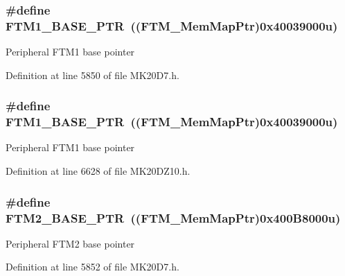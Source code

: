 \subsubsection[{\texorpdfstring{F\+T\+M1\+\_\+\+B\+A\+S\+E\+\_\+\+P\+TR}{FTM1_BASE_PTR}}]{\setlength{\rightskip}{0pt plus 5cm}\#define F\+T\+M1\+\_\+\+B\+A\+S\+E\+\_\+\+P\+TR~(({\bf F\+T\+M\+\_\+\+Mem\+Map\+Ptr})0x40039000u)}\hypertarget{group___f_t_m___peripheral_ga38115fba8eadfc94b2fc411f45906002}{}\label{group___f_t_m___peripheral_ga38115fba8eadfc94b2fc411f45906002}
Peripheral F\+T\+M1 base pointer 

Definition at line 5850 of file M\+K20\+D7.\+h.

\subsubsection[{\texorpdfstring{F\+T\+M1\+\_\+\+B\+A\+S\+E\+\_\+\+P\+TR}{FTM1_BASE_PTR}}]{\setlength{\rightskip}{0pt plus 5cm}\#define F\+T\+M1\+\_\+\+B\+A\+S\+E\+\_\+\+P\+TR~(({\bf F\+T\+M\+\_\+\+Mem\+Map\+Ptr})0x40039000u)}\hypertarget{group___f_t_m___peripheral_ga38115fba8eadfc94b2fc411f45906002}{}\label{group___f_t_m___peripheral_ga38115fba8eadfc94b2fc411f45906002}
Peripheral F\+T\+M1 base pointer 

Definition at line 6628 of file M\+K20\+D\+Z10.\+h.

\subsubsection[{\texorpdfstring{F\+T\+M2\+\_\+\+B\+A\+S\+E\+\_\+\+P\+TR}{FTM2_BASE_PTR}}]{\setlength{\rightskip}{0pt plus 5cm}\#define F\+T\+M2\+\_\+\+B\+A\+S\+E\+\_\+\+P\+TR~(({\bf F\+T\+M\+\_\+\+Mem\+Map\+Ptr})0x400\+B8000u)}\hypertarget{group___f_t_m___peripheral_ga897564efeaf1be1f991305d294eda3d6}{}\label{group___f_t_m___peripheral_ga897564efeaf1be1f991305d294eda3d6}
Peripheral F\+T\+M2 base pointer 

Definition at line 5852 of file M\+K20\+D7.\+h.


